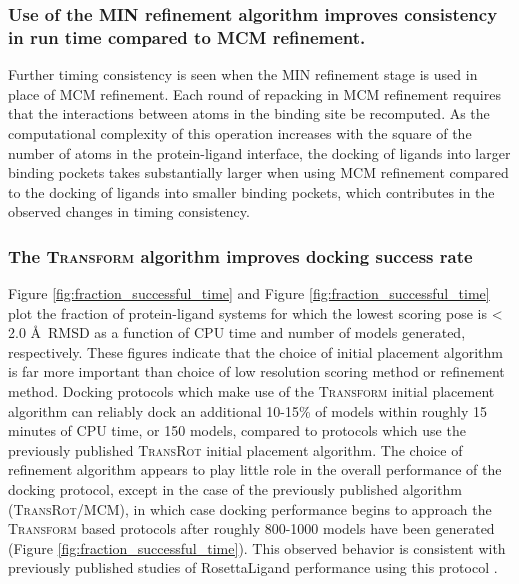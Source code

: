 \subsubsection{Use of the \acs{MIN} refinement algorithm improves consistency in run time compared to \acs{MCM} refinement.} 
Further timing consistency is seen when the \ac{MIN} refinement stage is used in place of \ac{MCM} refinement.
Each round of repacking in \ac{MCM} refinement requires that the interactions between atoms in the binding site be recomputed.
As the computational complexity of this operation increases with the square of the number of atoms in the protein-ligand interface, the docking of ligands into larger binding pockets takes substantially larger when using \ac{MCM} refinement compared to the docking of ligands into smaller binding pockets, which contributes in the observed changes in timing consistency.

\subsubsection{The \textsc{Transform} algorithm improves docking success rate}
Figure \ref{fig:fraction_successful_time} and Figure \ref{fig:fraction_successful_time} plot the fraction of protein-ligand systems for which the lowest scoring pose is < 2.0 \AA\ \ac{RMSD} as a function of \ac{CPU} time and number of models generated, respectively.
These figures indicate that the choice of initial placement algorithm is far more important than choice of low resolution scoring method or refinement method.
Docking protocols which make use of the \textsc{Transform} initial placement algorithm can reliably dock an additional 10-15\% of models within roughly 15 minutes of \ac{CPU} time, or 150 models, compared to protocols which use the previously published \textsc{TransRot} initial placement algorithm.
The choice of refinement algorithm appears to play little role in the overall performance of the docking protocol, except in the case of the previously published algorithm (\textsc{TransRot}/\ac{MCM}), in which case docking performance begins to approach the \textsc{Transform} based protocols after roughly 800-1000 models have been generated (Figure \ref{fig:fraction_successful_time}).
This observed behavior is consistent with previously published studies of RosettaLigand performance using this protocol \citep{Davis:2009fx,Combs:2013bl,Lemmon:2012ku}. 


